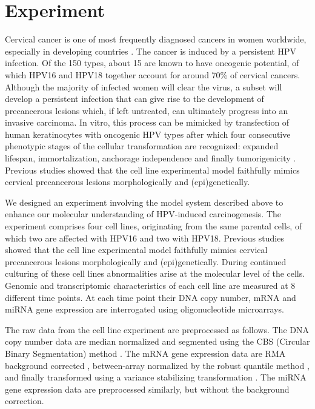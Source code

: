 \section{Experiment}
\label{sec:experiment}
Cervical cancer is one of most frequently diagnosed cancers in women worldwide, especially in developing countries \citep{Ferlay2015}. The cancer is induced by a persistent HPV infection. Of the 150 types, about 15 are known to have oncogenic potential, of which HPV16 and HPV18 together account for around 70\% of cervical cancers. Although the majority of infected women will clear the virus, a subset will develop a persistent infection that can give rise to the development of precancerous lesions which, if left untreated, can ultimately progress into an invasive carcinoma. In vitro, this process can be mimicked by transfection of human keratinocytes with oncogenic HPV types after which four consecutive phenotypic stages of the cellular transformation are recognized: expanded lifespan, immortalization, anchorage independence and finally tumorigenicity \citep{Pirisi1987}. Previous studies \citep{Steenbergen2004, Wilting2006, Henken2007} showed that the cell line experimental model faithfully mimics cervical precancerous lesions morphologically and (epi)genetically. 

We designed an experiment involving the model system described above to enhance our molecular understanding of HPV-induced carcinogenesis. The experiment comprises four cell lines, originating from the same parental cells, of which two are affected with HPV16 and two with HPV18. Previous studies \citep{Steenbergen2004, Wilting2006, Henken2007} showed that the cell line experimental model faithfully mimics cervical precancerous lesions morphologically and (epi)genetically. During continued culturing of these cell lines abnormalities arise at the molecular level of the cells. Genomic and transcriptomic characteristics of each cell line are measured at 8 different time points. At each time point their DNA copy number, mRNA and miRNA gene expression are interrogated using oligonucleotide microarrays. 

The raw data from the cell line experiment are preprocessed as follows. The DNA copy number data are median normalized and segmented using the CBS (Circular Binary Segmentation) method \citep{Olshen2004}. The mRNA gene expression data are RMA background corrected \citep{Irizarry2003}, between-array normalized by the robust quantile method \citep{Boldstad2003}, and finally transformed using a variance stabilizing transformation \citep{Huber2002}. The miRNA gene expression data are preprocessed similarly, but without the background correction. 

